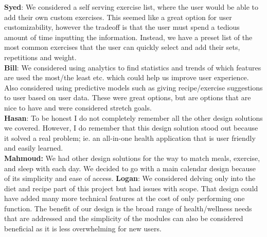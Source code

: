 \documentclass[12pt, titlepage]{article}
\begin{document}
\begin{enumerate}
		\textbf{Syed}: We considered a self serving exercise list, where the user would be able to add their own custom exercises. This seemed like a great option for user customizability, however the tradeoff is that the user must spend a tedious amount of time inputting the information. Instead, we have a preset list of the most common exercises that the user can quickly select and add their sets, repetitions and weight. \\
		\textbf{Bill}: We considered using analytics to find statistics and trends of which features are used the most/the least etc. which could help us improve user experience. Also considered using predictive models such as giving recipe/exercise suggestions to user based on user data. These were great options, but are options that are nice to have and were considered stretch goals. \\
		\textbf{Hasan}: To be honest I do not completely remember all the other design solutions we covered. However, I do remember that this design solution stood out because it solved a real problem; ie. an all-in-one health application that is user friendly and easily learned. \\
		\textbf{Mahmoud:} We had other design solutions for the way to match meals, exercise, and sleep with each day. We decided to go with a main calendar design because of its simplicity and ease of access. 
    \textbf{Logan}: We considered delving only into the diet and recipe part of this project but had issues with scope. That design could have added many more technical features at the cost of only performing one function. The benefit of our design is the broad range of health/wellness needs that are addressed and the simplicity of the modules can also be considered beneficial as it is less overwhelming for new users.
	\end{enumerate}
	
\end{document}
